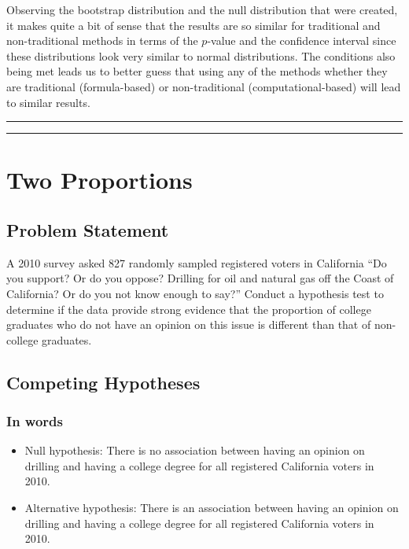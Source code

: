 \documentclass[]{tufte-book}
\let\oldrule=\rule
\renewcommand{\rule}[1]{\oldrule{\linewidth}}
\begin{document}
Observing the bootstrap distribution and the null distribution that were
created, it makes quite a bit of sense that the results are so similar
for traditional and non-traditional methods in terms of the \(p\)-value
and the confidence interval since these distributions look very similar
to normal distributions. The conditions also being met leads us to
better guess that using any of the methods whether they are traditional
(formula-based) or non-traditional (computational-based) will lead to
similar results.

\begin{center}\rule{0.5\linewidth}{\linethickness}\end{center}

\begin{center}\rule{0.5\linewidth}{\linethickness}\end{center}

\section{Two Proportions}\label{two-proportions}

\subsection{Problem Statement}\label{problem-statement-2}

A 2010 survey asked 827 randomly sampled registered voters in California
``Do you support? Or do you oppose? Drilling for oil and natural gas off
the Coast of California? Or do you not know enough to say?'' Conduct a
hypothesis test to determine if the data provide strong evidence that
the proportion of college graduates who do not have an opinion on this
issue is different than that of non-college graduates. \citep[Tweaked a
bit from][ {[}Chapter 6{]}]{isrs2014}

\subsection{Competing Hypotheses}\label{competing-hypotheses-2}

\subsubsection{In words}\label{in-words-2}

\begin{itemize}
\item
  Null hypothesis: There is no association between having an opinion on
  drilling and having a college degree for all registered California
  voters in 2010.
\item
  Alternative hypothesis: There is an association between having an
  opinion on drilling and having a college degree for all registered
  California voters in 2010.
\end{itemize}
\end{document}
